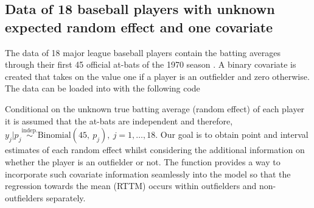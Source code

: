 \documentclass[article]{jss}
\begin{document}
\subsection[Unknown Second-level Mean and One Covariate]{Data of 18 baseball players with unknown expected random effect and one covariate} 

The data of 18 major league baseball players contain the batting averages
through their first 45 official at-bats of the 1970 season \citep{1975}. A
binary covariate is created that takes on the value one if a player is an
outfielder and zero otherwise. The data can be loaded into  with the following code
\begin{CodeChunk}
\end{CodeChunk}
Conditional on the unknown true batting average (random effect) of each player
it is assumed that the at-bats are independent and therefore, $y_{j}\vert p_{j} \textrm{Binomial}(45,~ p_{j}), ~j=1, \ldots, 18$. Our goal is to obtain point and interval estimates of each random effect whilst considering the additional information on whether the player is an outfielder or not. The function  provides a way to incorporate such covariate information seamlessly into the model so that the regression towards the mean (RTTM) occurs within outfielders and non-outfielders separately. %
\end{document}
